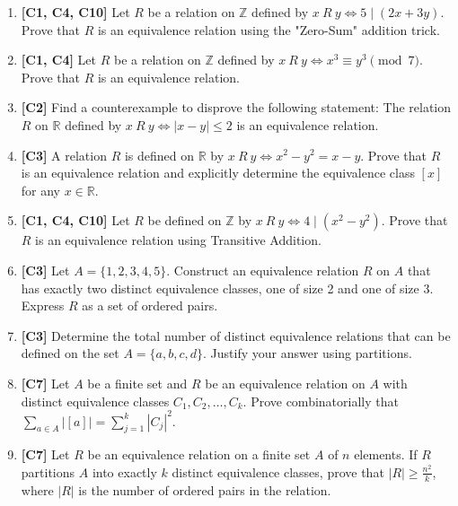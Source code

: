 \documentclass[11pt, a4paper]{article}
\theoremstyle{definition}
\theoremstyle{remark}
\newcommand{\R}{\mathbb{R}}
\newcommand{\Z}{\mathbb{Z}}
\begin{document}
\begin{enumerate}[label=\textbf{\arabic*.}, leftmargin=*]
    \item \textbf{[C1, C4, C10]} Let $R$ be a relation on $\Z$ defined by $x \ R \ y \iff 5 \mid (2x + 3y)$. Prove that $R$ is an equivalence relation using the "Zero-Sum" addition trick.
    
    \item \textbf{[C1, C4]} Let $R$ be a relation on $\Z$ defined by $x \ R \ y \iff x^3 \equiv y^3 \pmod 7$. Prove that $R$ is an equivalence relation.
    
    \item \textbf{[C2]} Find a counterexample to disprove the following statement: The relation $R$ on $\R$ defined by $x \ R \ y \iff |x - y| \le 2$ is an equivalence relation.
    
    \item \textbf{[C3]} A relation $R$ is defined on $\R$ by $x \ R \ y \iff x^2 - y^2 = x - y$. Prove that $R$ is an equivalence relation and explicitly determine the equivalence class $[x]$ for any $x \in \R$.
    
    \item \textbf{[C1, C4, C10]} Let $R$ be defined on $\Z$ by $x \ R \ y \iff 4 \mid (x^2 - y^2)$. Prove that $R$ is an equivalence relation using Transitive Addition.
    
    \item \textbf{[C3]} Let $A = \{1, 2, 3, 4, 5\}$. Construct an equivalence relation $R$ on $A$ that has exactly two distinct equivalence classes, one of size 2 and one of size 3. Express $R$ as a set of ordered pairs.
    
    \item \textbf{[C3]} Determine the total number of distinct equivalence relations that can be defined on the set $A = \{a, b, c, d\}$. Justify your answer using partitions.
    
    \item \textbf{[C7]} Let $A$ be a finite set and $R$ be an equivalence relation on $A$ with distinct equivalence classes $C_1, C_2, \dots, C_k$. Prove combinatorially that $\sum_{a \in A} |[a]| = \sum_{j=1}^k |C_j|^2$.
    
    \item \textbf{[C7]} Let $R$ be an equivalence relation on a finite set $A$ of $n$ elements. If $R$ partitions $A$ into exactly $k$ distinct equivalence classes, prove that $|R| \ge \frac{n^2}{k}$, where $|R|$ is the number of ordered pairs in the relation.
    

\end{enumerate}
\end{document}
